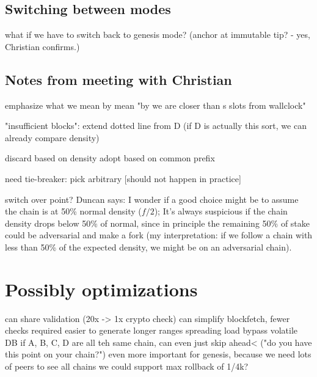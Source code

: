 \subsection{Switching between modes}
\label{genesis:switching-between-modes}

what if we have to switch back to genesis mode?
(anchor at immutable tip? - yes, Christian confirms.)

\subsection{Notes from meeting with Christian}

emphasize what we mean by mean "by we are closer than s slots from wallclock"

"insufficient blocks": extend dotted line from D
(if D is actually this sort, we can already compare density)

discard based on density
adopt based on common prefix

need tie-breaker: pick arbitrary [should not happen in practice]

switch over point? Duncan says: I wonder if a good choice might be to assume the chain is at 50\% normal density ($f/2$); It's always suspicious if the chain density drops below 50\% of normal, since in principle the remaining 50\% of stake could be adversarial and make a fork (my interpretation: if we follow a chain with less than 50\% of the expected density, we might be on an adversarial chain).




\section{Possibly optimizations}

can share validation (20x -> 1x crypto check)
can simplify blockfetch, fewer checks required
  easier to generate longer ranges
  spreading load
bypass volatile DB
if A, B, C, D are all teh same chain, can even just skip ahead<
  ("do you have this point on your chain?")
even more important for genesis, because we need lots of peers
to see all chains
we could support max rollback of 1/4k?
